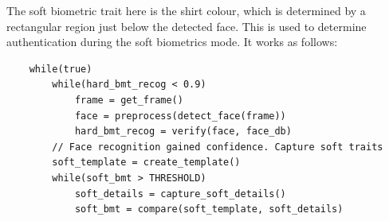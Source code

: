\documentclass[12pt]{article}			%
\begin{document}
The soft biometric trait here is the shirt colour, which is determined by a rectangular region just below the detected face. This is used to determine authentication during the soft biometrics mode. It works as follows:\\[2ex]

\begin{verbatim}
    while(true)
        while(hard_bmt_recog < 0.9)
            frame = get_frame()
            face = preprocess(detect_face(frame))
            hard_bmt_recog = verify(face, face_db)
        // Face recognition gained confidence. Capture soft traits
        soft_template = create_template()
        while(soft_bmt > THRESHOLD)
            soft_details = capture_soft_details()
            soft_bmt = compare(soft_template, soft_details)
\end{verbatim}
\end{document}
